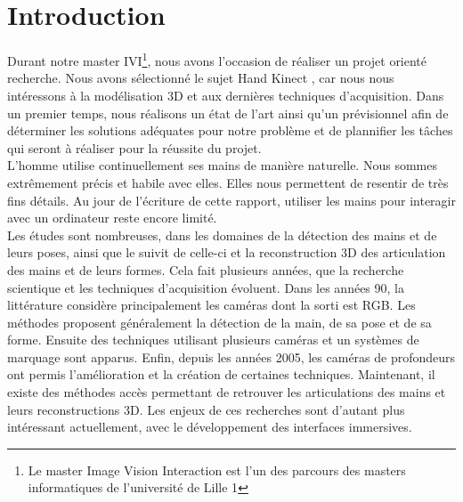 \chapter*{Introduction}

Durant notre master IVI\footnote{Le master Image Vision Interaction est 
l'un des parcours des masters informatiques de l'université de Lille 1}, 
nous avons l'occasion de réaliser un projet orienté recherche. Nous avons 
sélectionné le sujet \og Hand Kinect \fg, car nous nous intéressons à la 
modélisation 3D et aux dernières techniques d'acquisition. Dans un premier temps,
nous réalisons un état de l'art ainsi qu'un prévisionnel afin de déterminer 
les solutions adéquates pour notre problème et de plannifier les tâches qui
seront à réaliser pour la réussite du projet.\\

L'homme utilise continuellement ses mains de manière naturelle. Nous 
sommes extrêmement précis et habile avec elles. Elles nous permettent 
de resentir de très fins détails. Au jour de l'écriture de cette rapport,
utiliser les mains pour interagir avec un ordinateur reste encore limité.\\

Les études sont nombreuses, dans les domaines de la détection des mains 
et de leurs poses, ainsi que le suivit de celle-ci et la reconstruction 
3D des articulation des mains et de leurs formes. Cela fait plusieurs années, 
que la recherche scientique et les techniques d'acquisition évoluent. 
Dans les années 90, la littérature considère principalement les caméras 
dont la sorti est RGB. Les méthodes proposent généralement la détection 
de la main, de sa pose et de sa forme. Ensuite des techniques utilisant 
plusieurs caméras et un systèmes de marquage sont apparus. Enfin, depuis 
les années 2005, les caméras de profondeurs ont permis l'amélioration 
et la création de certaines techniques. Maintenant, il existe des méthodes 
accès permettant de retrouver les articulations des mains et leurs 
reconstructions 3D. Les enjeux de ces recherches sont d'autant plus 
intéressant actuellement, avec le développement des interfaces 
immersives.\\




